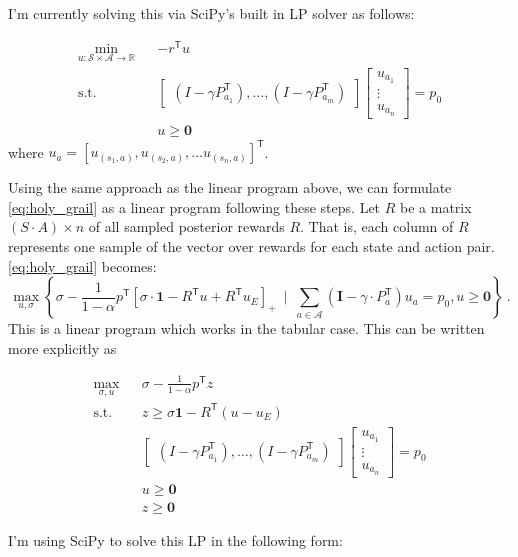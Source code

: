 \documentclass{article}
\newcommand{\tr}{^\mathsf{T}}
\newcommand{\one}{\mathbf{1}}
\newcommand{\zero}{\mathbf{0}}
\newcommand{\eye}{\mathbf{I}}
\newcommand{\states}{\mathcal{S}}
\newcommand{\actions}{\mathcal{A}}
\newcommand{\Real}{\mathbb{R}}
\begin{document}
I'm currently solving this via SciPy's built in LP solver as follows:

\begin{eqnarray}
\min_{u:\states\times\actions\to\Real}&& -r\tr u \\
\text{s.t.}&&\begin{bmatrix}
(I - \gamma P_{a_1}\tr), \ldots, (I - \gamma P_{a_m}\tr)
\end{bmatrix}
\begin{bmatrix}
u_{a_1} \\
\vdots\\
u_{a_n}
\end{bmatrix}
= p_0 \\
&& u \geq \zero
\end{eqnarray}
where $u_{a} = [u_{(s_1, a)}, u_{(s_2, a)}, \ldots u_{(s_n, a)}]\tr$. 

	Using the same approach as the linear program above, we can formulate \eqref{eq:holy_grail} as a linear program following these steps. Let $R$ be a matrix $(S\cdot A) \times n$ of all sampled posterior rewards $R$. That is, each column of $R$ represents one sample of the vector over rewards for each state and action pair. \eqref{eq:holy_grail} becomes:
	\begin{equation} \label{eq:lp_objective}
	\max_{u,\sigma} \left\{ \sigma -\frac{1}{1-\alpha} p\tr \left[\sigma\cdot\one - R\tr u  + R\tr u_E \right]_+  ~\mid~ \sum_{a\in\mathcal{A}} (\eye - \gamma\cdot P_a\tr) u_a = p_0, u \ge \zero \right\}~.  
	\end{equation}
	This is a linear program which works in the tabular case. This can be written more explicitly as 
	
\begin{eqnarray}
\max_{\sigma, u}&& \sigma - \frac{1}{1-\alpha}p\tr z \\
\text{s.t.}&& z \geq \sigma \one - R\tr(u - u_E)\\
&&\begin{bmatrix}
(I - \gamma P_{a_1}\tr), \ldots, (I - \gamma P_{a_m}\tr)
\end{bmatrix}
\begin{bmatrix}
u_{a_1} \\
\vdots\\
u_{a_n}
\end{bmatrix}
= p_0 \\
&& u \geq \zero \\
&& z \geq \zero 
\end{eqnarray}		
	
	
I'm using SciPy to solve this LP in the following form:
\end{document}
